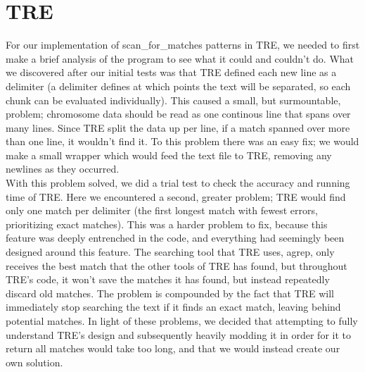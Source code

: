 \section{TRE}\label{tre}
  
For our implementation of scan\_for\_matches patterns in TRE, we needed to 
first make a brief analysis of the program to see what it could and couldn't 
do. What we discovered after our initial tests was that TRE defined each 
new line as a delimiter (a delimiter defines at which points the text will be 
separated, so each chunk can be evaluated individually). 
This caused a small, but surmountable, problem; chromosome data 
should be read as one continous line that spans over many lines. Since TRE 
split the data up per line, if a match spanned over more than one line, it 
wouldn't find it. To this problem there was an easy fix; we would make a small 
wrapper which would feed the text file to TRE, removing any newlines as they 
occurred.\\
With this problem solved, we did a trial test to check the accuracy and 
running time of TRE. Here we encountered a second, greater problem; TRE 
would find only one match per delimiter (the first longest match with fewest 
errors, prioritizing exact matches). This was a harder problem to fix, because this feature was 
deeply entrenched in the code, and everything had seemingly been designed 
around this feature. The searching tool that TRE uses, agrep, only receives 
the best match that the other tools of TRE has found, but throughout TRE's 
code, it won't save the matches it has found, but instead repeatedly discard old 
matches. The problem is compounded by the fact that TRE will immediately stop searching the 
text if it finds an exact match, leaving behind potential matches. In light of 
these problems, we decided that attempting to fully understand TRE's design and 
subsequently heavily modding it in order for it to return all matches would 
take too long, and that we would instead create our own solution.
